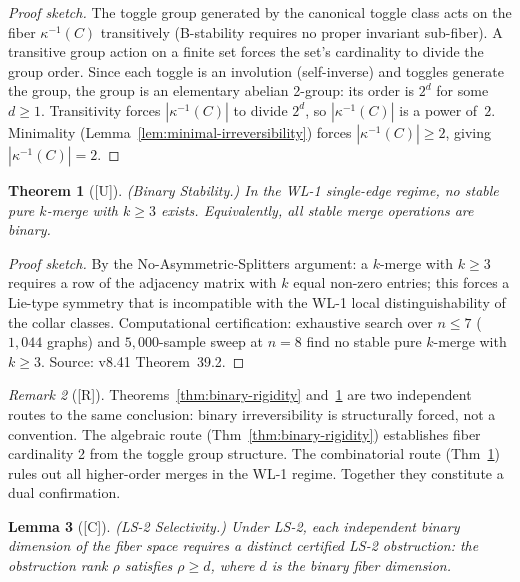 \documentclass[12pt,oneside]{amsbook}
\theoremstyle{plain}
\newtheorem{theorem}{Theorem}[section]
\newtheorem{lemma}[theorem]{Lemma}
\theoremstyle{definition}
\theoremstyle{remark}
\newtheorem{remark}[theorem]{Remark}
\newcommand{\status}[1]{\textup{[#1]}}
\begin{document}
\begin{proof}[Proof sketch]
The toggle group generated by the canonical toggle class acts on the
fiber $\kappa^{-1}(C)$ transitively (B-stability requires no proper
invariant sub-fiber).  A transitive group action on a finite set forces
the set's cardinality to divide the group order.  Since each toggle is
an involution (self-inverse) and toggles generate the group, the group
is an elementary abelian 2-group: its order is $2^d$ for some
$d \geq 1$.  Transitivity forces $|\kappa^{-1}(C)|$ to divide $2^d$,
so $|\kappa^{-1}(C)|$ is a power of~$2$.  Minimality
(Lemma~\ref{lem:minimal-irreversibility}) forces
$|\kappa^{-1}(C)| \geq 2$, giving $|\kappa^{-1}(C)| = 2$.
\end{proof}

\begin{theorem}[\status{U}]\label{thm:binary-stability}
\textup{(Binary Stability.)}  In the WL-1 single-edge regime, no
stable pure $k$-merge with $k \geq 3$ exists.  Equivalently, all
stable merge operations are binary.
\end{theorem}

\begin{proof}[Proof sketch]
By the No-Asymmetric-Splitters argument: a $k$-merge with $k \geq 3$
requires a row of the adjacency matrix with $k$ equal non-zero entries;
this forces a Lie-type symmetry that is incompatible with the
WL-1 local distinguishability of the collar classes.  Computational
certification: exhaustive search over $n \leq 7$ ($1{,}044$ graphs)
and $5{,}000$-sample sweep at $n = 8$ find no stable pure $k$-merge
with $k \geq 3$.  Source: v8.41 Theorem~39.2.
\end{proof}

\begin{remark}[\status{R}]
Theorems~\ref{thm:binary-rigidity} and~\ref{thm:binary-stability} are
two independent routes to the same conclusion: binary irreversibility
is structurally forced, not a convention.  The algebraic route
(Thm~\ref{thm:binary-rigidity}) establishes fiber cardinality 2 from
the toggle group structure.  The combinatorial route
(Thm~\ref{thm:binary-stability}) rules out all higher-order merges in
the WL-1 regime.  Together they constitute a dual confirmation.
\end{remark}


\begin{lemma}[\status{C}]\label{lem:ls2-selectivity}
\textup{(LS-2 Selectivity.)}  Under LS-2, each independent binary
dimension of the fiber space requires a distinct certified LS-2
obstruction: the obstruction rank $\rho$ satisfies $\rho \geq d$,
where $d$ is the binary fiber dimension.
\end{lemma}
\end{document}
